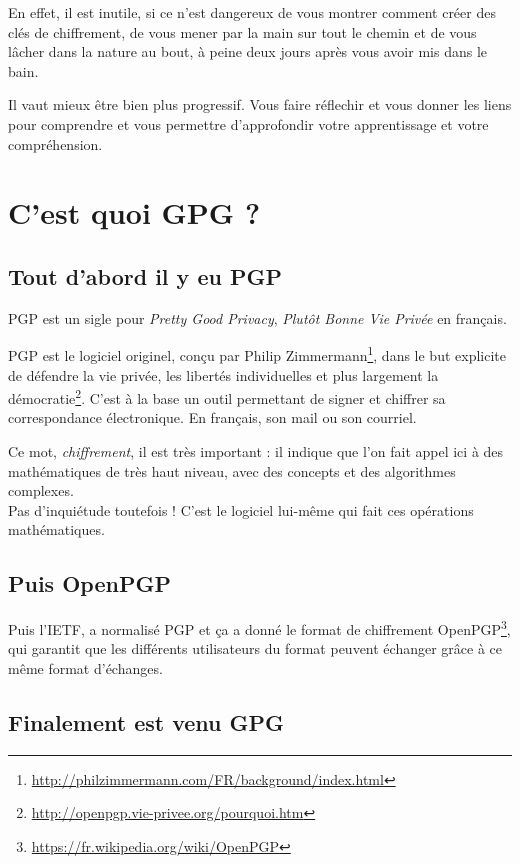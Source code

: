 En effet, il est inutile, si ce n'est dangereux de vous montrer comment
créer des clés de chiffrement, de vous mener par la main sur tout le
chemin et de vous lâcher dans la nature au bout, à peine deux jours
après vous avoir mis dans le bain.

Il vaut mieux être bien plus progressif. Vous faire réflechir et vous
donner les liens pour comprendre et vous permettre d'approfondir votre
apprentissage et votre compréhension.

\section{C'est quoi GPG ?}\label{cest-quoi-gpg}

\subsection{Tout d'abord il y eu PGP}\label{tout-dabord-il-y-eu-pgp}

PGP est un sigle pour \emph{Pretty Good Privacy}, \emph{Plutôt Bonne Vie Privée} en français.

PGP est le logiciel originel, conçu par Philip Zimmermann\footnote{\url{http://philzimmermann.com/FR/background/index.html}}, dans le
but explicite de défendre la vie privée, les libertés individuelles et plus largement la démocratie\footnote{\url{http://openpgp.vie-privee.org/pourquoi.htm}}. C'est à la base un outil permettant de signer et chiffrer sa correspondance électronique. En français, son mail ou son courriel.

Ce mot, \emph{chiffrement}, il est très important : il indique que l'on
fait appel ici à des mathématiques de très haut niveau, avec des
concepts et des algorithmes complexes.\\Pas d'inquiétude toutefois !
C'est le logiciel lui-même qui fait ces opérations mathématiques.

\subsection{Puis OpenPGP}\label{puis-openpgp}

Puis l'IETF, a normalisé PGP et ça a donné le format de chiffrement OpenPGP\footnote{\url{https://fr.wikipedia.org/wiki/OpenPGP}}, qui garantit que
les différents utilisateurs du format peuvent échanger grâce à ce même format d'échanges.

\subsection{Finalement est venu GPG}\label{finalement-est-venu-gpg}

